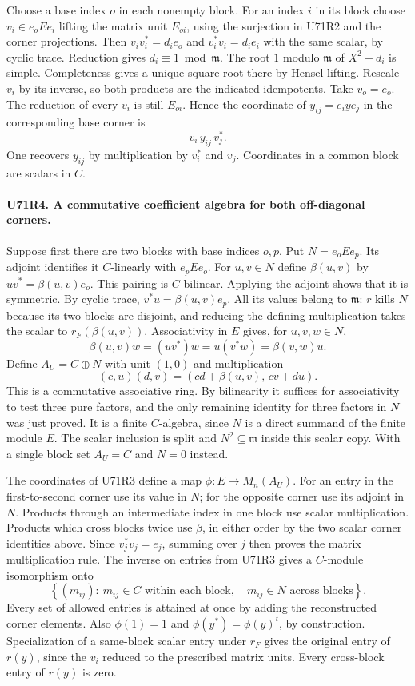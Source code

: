 Choose a base index $o$ in each nonempty block. For an index
$i$ in its block choose $v_i\in e_oEe_i$ lifting the matrix unit
$E_{oi}$, using the surjection in U71R2 and the corner projections.
Then $v_i v_i^*=d_i e_o$ and $v_i^*v_i=d_i e_i$ with the same
scalar, by cyclic trace. Reduction gives $d_i\equiv1\bmod\mathfrak m$.
The root $1$ modulo $\mathfrak m$ of $X^2-d_i$ is simple.
Completeness gives a unique square root there by Hensel lifting.
Rescale $v_i$ by its inverse, so both products are the indicated
idempotents. Take $v_o=e_o$. The reduction of every $v_i$ is
still $E_{oi}$. Hence the coordinate of $y_{ij}=e_iye_j$ in
the corresponding base corner is
\[
                    v_i\,y_{ij}\,v_j^*.
\]
One recovers $y_{ij}$ by multiplication by $v_i^*$ and $v_j$.
Coordinates in a common block are scalars in $C$.

\paragraph{U71R4. A commutative coefficient algebra for both off-diagonal corners.}
Suppose first there are two blocks with base indices $o,p$.
Put $N=e_oEe_p$. Its adjoint identifies it $C$-linearly with
$e_pEe_o$. For $u,v\in N$ define $\beta(u,v)$ by
$uv^*=\beta(u,v)e_o$. This pairing is $C$-bilinear. Applying
the adjoint shows that it is symmetric. By cyclic trace,
$v^*u=\beta(u,v)e_p$. All its values belong to $\mathfrak m$:
$r$ kills $N$ because its two blocks are disjoint, and reducing
the defining multiplication takes the scalar to $r_F(\beta(u,v))$.
Associativity in $E$ gives, for $u,v,w\in N$,
\[
 \beta(u,v)w=(uv^*)w=u(v^*w)=\beta(v,w)u.
\]
Define $A_U=C\oplus N$ with unit $(1,0)$ and multiplication
\[
 (c,u)(d,v)=(cd+\beta(u,v),\,cv+du).
\]
This is a commutative associative ring. By bilinearity it suffices
for associativity to test three pure factors, and the only
remaining identity for three factors in $N$ was just proved.
It is a finite $C$-algebra, since $N$ is a direct summand of
the finite module $E$. The scalar inclusion is split and
$N^2\subseteq\mathfrak m$ inside this scalar copy.
With a single block set $A_U=C$ and $N=0$ instead.

The coordinates of U71R3 define a map
$\phi:E\to M_n(A_U)$. For an entry in the first-to-second
corner use its value in $N$; for the opposite corner use its
adjoint in $N$. Products through an intermediate index in one
block use scalar multiplication. Products which cross blocks
twice use $\beta$, in either order by the two scalar corner
identities above. Since $v_j^*v_j=e_j$, summing over $j$
then proves the matrix multiplication rule. The inverse on
entries from U71R3 gives a $C$-module isomorphism onto
\[
 \left\{(m_{ij}):\
   m_{ij}\in C\text{ within each block},\quad
   m_{ij}\in N\text{ across blocks}\right\}.
\]
Every set of allowed entries is attained at once by adding the
reconstructed corner elements. Also $\phi(1)=1$ and
$\phi(y^*)=\phi(y)^t$, by construction. Specialization of a
same-block scalar entry under $r_F$ gives the original entry of
$r(y)$, since the $v_i$ reduced to the prescribed matrix units.
Every cross-block entry of $r(y)$ is zero.

